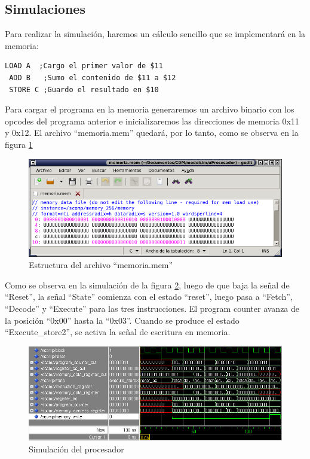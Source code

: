\subsection{Simulaciones}
Para realizar la simulación, haremos un cálculo sencillo que se implementará en la memoria:


\begin{lstlisting}[basicstyle=\footnotesize\ttfamily]
 LOAD A  ;Cargo el primer valor de $11
 ADD B   ;Sumo el contenido de $11 a $12
 STORE C ;Guardo el resultado en $10
\end{lstlisting}
\lstset{language=vhdl}

Para cargar el programa en la memoria generaremos un archivo
binario con los opcodes del programa anterior e inicializaremos las
direcciones de memoria 0x11 y 0x12. El archivo ``memoria.mem'' 
quedará, por lo tanto, como se observa en la figura \ref{uprocmemoria}

\begin{figure}[h!]
  \centering
    \includegraphics[width=1\textwidth]{graficos/memoria_uproc.png}
  \caption{Estructura del archivo ``memoria.mem''}
  \label{uprocmemoria}
\end{figure}

Como se observa en la simulación de la figura \ref{msuprocesador}, luego de que baja la señal de 
``Reset'', la señal ``State'' comienza con el estado ``reset'', luego pasa a ``Fetch'', ``Decode'' 
y ``Execute'' para las tres instrucciones. El program counter avanza de la posición ``0x00'' hasta
la ``0x03''. Cuando se produce el estado ``Execute\_store2'', se activa la señal de escritura en memoria.

\begin{figure}[h!]
  \centering
    \includegraphics[width=1\textwidth]{graficos/uprocesador.png}
  \caption{Simulación del procesador}
  \label{msuprocesador}
\end{figure}

